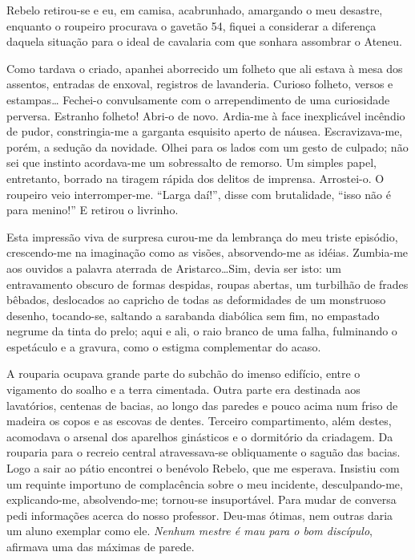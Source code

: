 Rebelo retirou{}-se e eu, em camisa, acabrunhado, amargando o meu desastre,
enquanto o roupeiro procurava o gavetão 54, fiquei a considerar a
diferença daquela situação para o ideal de cavalaria com que sonhara
assombrar o Ateneu. 

Como tardava o criado, apanhei aborrecido um
folheto que ali estava à mesa dos assentos, entradas de enxoval,
registros de lavanderia. Curioso folheto, versos e estampas\ldots
Fechei{}-o convulsamente com o arrependimento de uma curiosidade
perversa. Estranho folheto! Abri{}-o de novo. Ardia{}-me à face
inexplicável incêndio de pudor, constringia{}-me a garganta esquisito
aperto de náusea. Escravizava{}-me, porém, a sedução da novidade. Olhei
para os lados com um gesto de culpado; não sei que instinto
acordava{}-me um sobressalto de remorso. Um simples papel, entretanto,
borrado na tiragem rápida dos delitos de imprensa. Arrostei{}-o. O
roupeiro veio interromper{}-me. ``Larga daí!'', disse com brutalidade, 
``isso não é para menino!'' E retirou o livrinho. 

Esta impressão viva de
surpresa curou{}-me da lembrança do meu triste episódio, crescendo{}-me
na imaginação como as visões, absorvendo{}-me as idéias. Zumbia{}-me
aos ouvidos a palavra aterrada de Aristarco\ldots Sim, devia ser isto: um
entravamento obscuro de formas despidas, roupas abertas, um turbilhão
de frades bêbados, deslocados ao capricho de todas as deformidades de
um monstruoso desenho, tocando{}-se, saltando a sarabanda diabólica sem
fim, no empastado negrume da tinta do prelo; aqui e ali, o raio branco
de uma falha, fulminando o espetáculo e a gravura, como o estigma
complementar do acaso. 

A rouparia ocupava grande parte do subchão do
imenso edifício, entre o vigamento do soalho e a terra cimentada. Outra
parte era destinada aos lavatórios, centenas de bacias, ao longo das
paredes e pouco acima num friso de madeira os copos e as escovas de
dentes. Terceiro compartimento, além destes, acomodava o arsenal dos
aparelhos ginásticos e o dormitório da criadagem. Da rouparia para o
recreio central atravessava{}-se obliquamente o saguão das bacias. Logo
a sair ao pátio encontrei o benévolo Rebelo, que me esperava. Insistiu
com um requinte importuno de complacência sobre o meu incidente,
desculpando{}-me, explicando{}-me, absolvendo{}-me; tornou{}-se
insuportável. Para mudar de conversa pedi informações acerca do nosso
professor. Deu{}-mas ótimas, nem outras daria um aluno exemplar como
ele. \textit{Nenhum mestre é mau para o bom discípulo}, afirmava 
uma das máximas de parede. 

